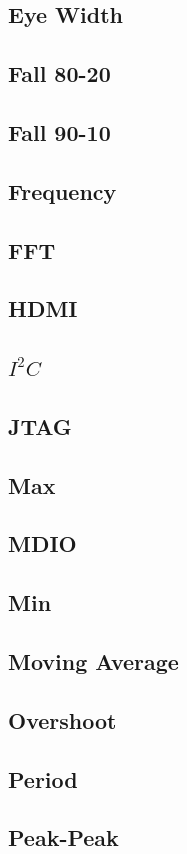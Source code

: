 \documentclass[11pt]{article}
\begin{document}
\subsection{Eye Width}
\subsection{Fall 80-20}
\subsection{Fall 90-10}
\subsection{Frequency}
\subsection{FFT}
\subsection{HDMI}
\label{filter:hdmi}
\subsection{$I^2C$}
\subsection{JTAG}
\subsection{Max}
\subsection{MDIO}
\subsection{Min}
\subsection{Moving Average}
\subsection{Overshoot}
\subsection{Period}
\subsection{Peak-Peak}
\end{document}
